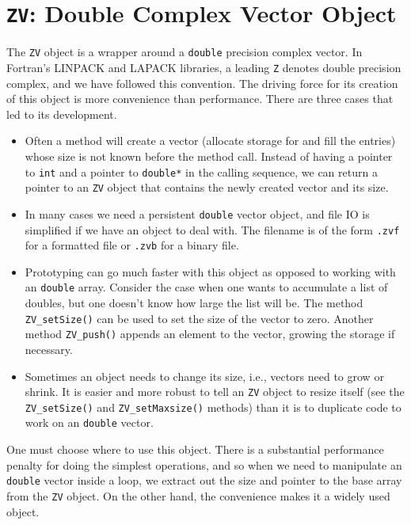 \chapter{{\tt ZV}: Double Complex Vector Object}
\par
The {\tt ZV} object is a wrapper around a {\tt double} precision
complex vector.
In Fortran's LINPACK and LAPACK libraries, a leading {\tt Z}
denotes double precision complex, and we have followed this
convention.
The driving force for its creation of this object 
is more convenience than performance.
There are three cases that led to its development.
\begin{itemize}
\item 
Often a method will create a vector (allocate storage for and fill
the entries) whose size is not known before the method call.
Instead of having a pointer to {\tt int} and a pointer to {\tt double*}
in the calling sequence, we can return a pointer to an {\tt ZV}
object that contains the newly created vector and its size.
\item
In many cases we need a persistent {\tt double} vector object,
and file IO is simplified if we have an object to deal with.
The filename is of the form {\tt *.zvf} for a formatted file
or {\tt *.zvb} for a binary file.
\item
Prototyping can go much faster with this object as opposed to
working with an {\tt double} array.
Consider the case when one wants to accumulate a list of doubles,
but one doesn't know how large the list will be.
The method {\tt ZV\_setSize()} can be used to set 
the size of the vector to zero.
Another method {\tt ZV\_push()} appends an element to the vector,
growing the storage if necessary.
\item
Sometimes an object needs to change its size, i.e., vectors need to
grow or shrink.
It is easier and more robust to tell an {\tt ZV} object to resize
itself (see the {\tt ZV\_setSize()} and {\tt ZV\_setMaxsize()}
methods) than it is to duplicate code to work on an {\tt double}
vector.
\end{itemize}
One must choose where to use this object.
There is a substantial performance penalty for doing the simplest
operations, and so when we need to manipulate an {\tt double} vector
inside a loop, we extract out the size and pointer to the base
array from the {\tt ZV} object.
On the other hand, the convenience makes it a widely used object.
\par

